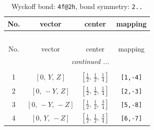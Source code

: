 \documentclass[fleqn,8pt]{jsarticle}
\begin{document}
\renewcommand{\arraystretch}{1.2}
\begin{longtable}{cccc}
\caption{Wyckoff bond: {\tt 4f@2h}, bond symmetry: {\tt 2..}}
 \\
 \hline \hline
No. & vector & center & mapping \\ \hline \endfirsthead

\multicolumn{3}{l}{\tablename\ \thetable{}} \\
 \hline \hline
No. & vector & center & mapping \\ \hline \endhead

 \hline \hline
\multicolumn{3}{r}{\footnotesize\it continued ...} \\ \endfoot

 \hline \hline
\multicolumn{3}{r}{} \\ \endlastfoot

1 & $\left[ 0,\, Y,\, Z \right]$ & $\left[ \frac{1}{2},\, \frac{1}{2},\, \frac{1}{4} \right]$ & {\tt [1,-4]} \\ \hline
2 & $\left[ 0,\, - Y,\, Z \right]$ & $\left[ \frac{1}{2},\, \frac{1}{2},\, \frac{1}{4} \right]$ & {\tt [2,-3]} \\ \hline
3 & $\left[ 0,\, - Y,\, - Z \right]$ & $\left[ \frac{1}{2},\, \frac{1}{2},\, \frac{3}{4} \right]$ & {\tt [5,-8]} \\ \hline
4 & $\left[ 0,\, Y,\, - Z \right]$ & $\left[ \frac{1}{2},\, \frac{1}{2},\, \frac{3}{4} \right]$ & {\tt [6,-7]} \\
\end{longtable}
\renewcommand{\arraystretch}{1.2}
\end{document}
